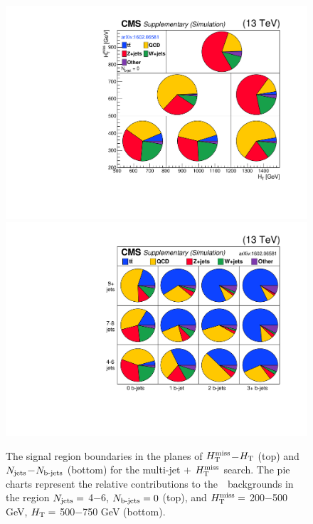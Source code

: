 \begin{figure}[h]
\centering
\includegraphics[height=0.442\textwidth]{figures/SusySearches/Ra2b2015/aux/MC_BG_Pie_NB0.pdf}
\hspace{-1cm}
\includegraphics[height=0.445\textwidth]{figures/SusySearches/Ra2b2015/aux/MC_BG_Pie_vs_NJets_NBJets.pdf}
\caption{The signal region boundaries in the planes of $H_{\text{T}}^{\rm miss}$$-$$H_{\rm T}$ (top) and $N_{\rm jets}$$-$$N_{\text{b-jets}}$ (bottom) for the multi-jet $+$ $H_{\text{T}}^{\rm miss}$ 
search. The pie charts represent the relative contributions
 to the~\sm~backgrounds in the region $N_{\rm jets}=$ 4$-$6, $N_{\text{b-jets}}=0$ (top), and $H_{\text{T}}^{\rm miss}=$ 200$-$500 GeV, $H_{\rm T}=$ 500$-$750 GeV (bottom).}
\label{fig:ra2bArray}
\end{figure}



